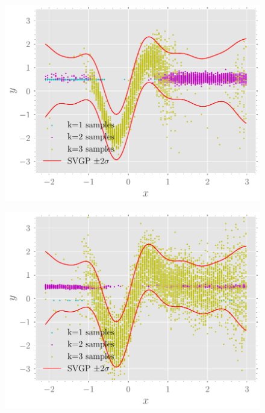 \documentclass{mimosis-class/mimosis}
\numberwithin{equation}{chapter}
\begin{document}
{\begin{figure}[t!]
\begin{minipage}[r]{0.49\textwidth}
\includegraphics[width=\textwidth]{./images/model/mcycle/K=3_L2/y_samples.pdf}
\label{fig-y-samples-mcycle-three-experts-tight}
\end{minipage}
\begin{minipage}[r]{0.49\textwidth}
\includegraphics[width=\textwidth]{./images/model/mcycle/K=3_L3/y_samples.pdf}
\label{fig-y-samples-mcycle-three-experts-further}
\end{minipage}

\end{figure}}
\end{document}
